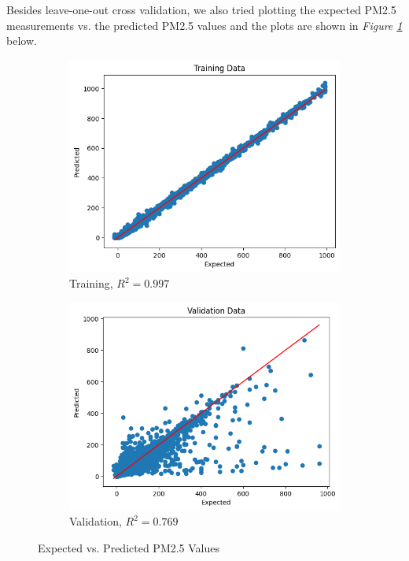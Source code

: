 \documentclass[draft]{agujournal2019}
\begin{document}
Besides leave-one-out cross validation, we also tried plotting the expected PM2.5 measurements vs. the predicted PM2.5 values and the plots are shown in \textit{Figure \ref{fig:eval}} below.

\begin{figure}[htbp]
    \begin{subfigure}[b]{0.48\textwidth}
        \centering
        \includegraphics[width=\textwidth]{calibration/training_eval.png}
        \caption{Training, \(R^2 = 0.997\)}
    \end{subfigure}
    \hfill
    \begin{subfigure}[b]{0.48\textwidth}
        \centering
        \includegraphics[width=\textwidth]{calibration/validation_eval.png}
        \caption{Validation, \(R^2 = 0.769\)}
    \end{subfigure}
    \caption{Expected vs. Predicted PM2.5 Values}
    \label{fig:eval}
\end{figure}
\end{document}
